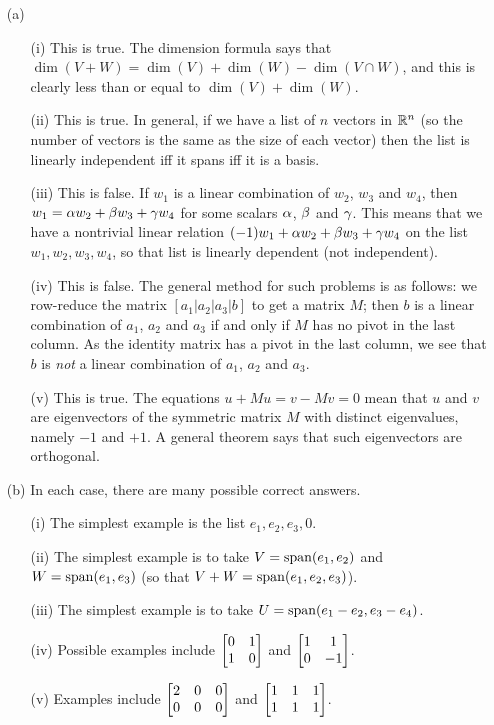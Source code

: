 \documentclass[a4paper]{article}
\begin{document}
\begin{solution}
 \begin{itemize}
  \item[(a)]
   \begin{itemize}
    \item[(i)] This is true. \mk The dimension formula says that
     $\dim(V+W)=\dim(V)+\dim(W)-\dim(V\cap W)$, and this is clearly
     less than or equal to $\dim(V)+\dim(W)$. \mk
    \item[(ii)] This is true.  \mk In general, if we have a list of $n$
     vectors in ${\mathbb{R}}^n$ (so the number of vectors is the same as the
     size of each vector) then the list is linearly independent iff it
     spans iff it is a basis. \mk
    \item[(iii)] This is false. \mk If $w_1$ is a linear combination of
     $w_2$, $w_3$ and $w_4$, then $w_1=\alpha w_2+\beta w_3+\gamma w_4$ for
     some scalars $\alpha$, $\beta$ and $\gamma$.  This means that we have a
     nontrivial linear relation $(-1)w_1+\alpha w_2+\beta w_3+\gamma w_4$ on
     the list $w_1,w_2,w_3,w_4$, so that list is linearly dependent
     (not independent). \mk
    \item[(iv)] This is false. \mk The general method for such problems
     is as follows: we row-reduce the matrix $[a_1|a_2|a_3|b]$ to get
     a matrix $M$; then $b$ is a linear combination of $a_1$, $a_2$
     and $a_3$ if and only if $M$ has no pivot in the last column.  As
     the identity matrix has a pivot in the last column, we see that
     $b$ is \emph{not} a linear combination of $a_1$, $a_2$ and
     $a_3$. \mk
    \item[(v)] This is true. \mk The equations $u+Mu=v-Mv=0$ mean that
     $u$ and $v$ are eigenvectors of the symmetric matrix $M$ with
     distinct eigenvalues, namely $-1$ and $+1$.  A general theorem
     says that such eigenvectors are orthogonal. \mk
   \end{itemize}
  \item[(b)] In each case, there are many possible correct answers.
   \begin{itemize}
    \item[(i)] The simplest example is the list $e_1,e_2,e_3,0$. 
    \item[(ii)] The simplest example is to take $V=\operatorname{span}(e_1,e_2)$ and
     $W=\operatorname{span}(e_1,e_3)$ (so that $V+W=\operatorname{span}(e_1,e_2,e_3)$). 
    \item[(iii)] The simplest example is to take
     $U=\operatorname{span}(e_1-e_2,e_3-e_4)$. 
    \item[(iv)] Possible examples include $\left[\begin{matrix} 0&1\\1&0\end{matrix}\right]$ and
     $\left[\begin{matrix} 1&1\\0&-1\end{matrix}\right]$. 
    \item[(v)] Examples include $\left[\begin{matrix} 2&0&0\\0&0&0\end{matrix}\right]$ and
     $\left[\begin{matrix} 1&1&1\\1&1&1\end{matrix}\right]$. 
   \end{itemize}
 \end{itemize}
\end{solution}
\end{document}
